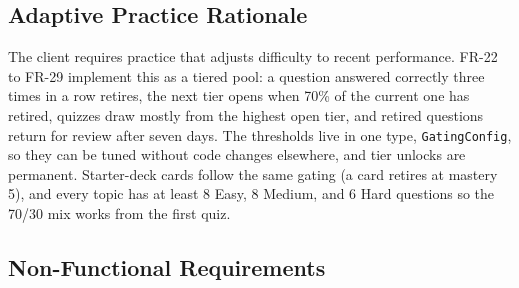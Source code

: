 \documentclass[12pt,letterpaper]{article}
\begin{document}
\subsection{Adaptive Practice Rationale}
The client requires practice that adjusts difficulty to recent performance. FR-22 to
FR-29 implement this as a tiered pool: a question answered correctly three times in a
row retires, the next tier opens when 70\% of the current one has retired, quizzes
draw mostly from the highest open tier, and retired questions return for review after
seven days. The thresholds live in one type, \texttt{GatingConfig}, so they can be
tuned without code changes elsewhere, and tier unlocks are permanent. Starter-deck
cards follow the same gating (a card retires at mastery 5), and every topic has at
least 8 Easy, 8 Medium, and 6 Hard questions so the 70/30 mix works from the first
quiz.

\subsection{Non-Functional Requirements}
\end{document}

